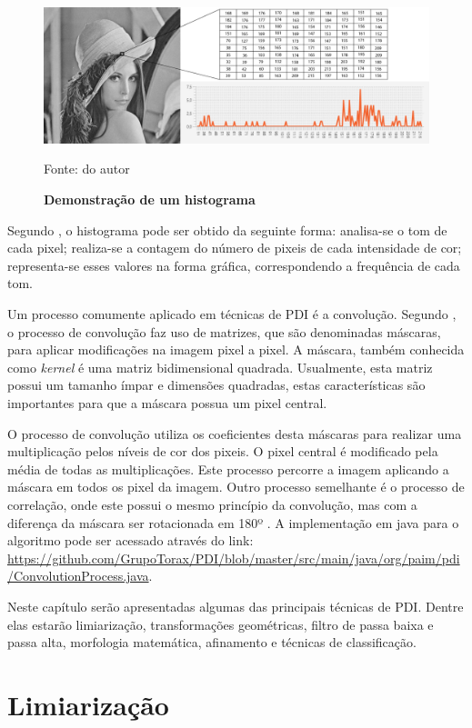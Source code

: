 \documentclass[
	12pt,				%
	oneside,			%
	a4paper,			%
	english,			%
	french,				%
	spanish,			%
	brazil,				%
	]{abntex2}
\begin{document}
\begin{figure}[ht]
\centering
\caption{\textbf{Demonstração de um histograma}}
\includegraphics[width=1\textwidth]{imagens/histograma.png}
\label{fig:histograma}

Fonte: do autor
\end{figure}


Segundo \citet{conciAzevedoLeta:2008}, o histograma pode ser obtido da seguinte forma: analisa-se o tom de cada pixel; realiza-se a contagem do número de pixeis de cada intensidade de cor; representa-se esses valores na forma gráfica, correspondendo a frequência de cada tom.

Um processo comumente aplicado em técnicas de PDI é a convolução. Segundo \citet{pedriniSchwartz:2008}, o processo de convolução faz uso de matrizes, que são denominadas máscaras, para aplicar modificações na imagem pixel a pixel. A máscara, também conhecida como \textit{kernel} é uma matriz bidimensional quadrada. Usualmente, esta matriz possui um tamanho ímpar e dimensões quadradas, estas características são importantes para que a máscara possua um pixel central.

O processo de convolução utiliza os coeficientes desta máscaras para realizar uma multiplicação pelos níveis de cor dos pixeis. O pixel central é modificado pela média de todas as multiplicações. Este processo percorre a imagem aplicando a máscara em todos os pixel da imagem. Outro processo semelhante é o processo de correlação, onde este possui o mesmo princípio da convolução, mas com a diferença da máscara ser rotacionada em 180º \cite{gonzalesWoods:2008}. A implementação em java para o algoritmo pode ser acessado através do link: \url{https://github.com/GrupoTorax/PDI/blob/master/src/main/java/org/paim/pdi/ConvolutionProcess.java}.

Neste capítulo serão apresentadas algumas das principais técnicas de PDI. Dentre elas estarão limiarização, transformações geométricas, filtro de passa baixa e passa alta, morfologia matemática, afinamento e técnicas de classificação.
\section{Limiarização}
\label{sec:limiarizacao}
\end{document}
